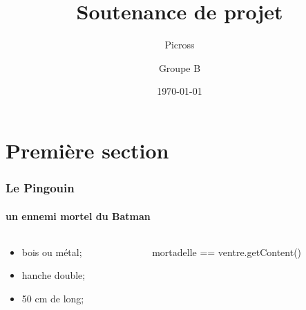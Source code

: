\documentclass[12pt]{beamer}
\title{Soutenance de projet}
\subtitle{Picross}
\author{Groupe B}
\date{\today}
\institute{Université du Maine}
\begin{document}
        \frame{\titlepage}
        \frame{\tableofcontents}




\section[]{Première section}
\begin{frame}
       \frametitle{Le Pingouin}
        \framesubtitle{un ennemi mortel du Batman}

        \begin{columns}[c] %
        	\begin{column}{5.5cm} %
			\begin{itemize}
				\item bois ou métal;
				\bigskip
				\item hanche double;
				\item 50 cm de long;
			\end{itemize}

        	\end{column}
        	\begin{column}{5.0cm} %
			mortadelle == ventre.getContent()
        	\end{column}
        \end{columns}

\end{frame}
\end{document}
